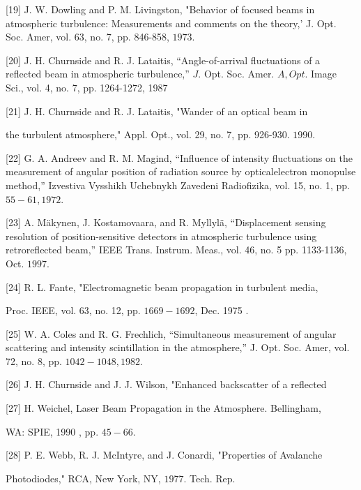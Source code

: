 \documentclass[10pt]{article}
\begin{document}
[19] J. W. Dowling and P. M. Livingston, "Behavior of focused beams in atmospheric turbulence: Measurements and comments on the theory,’ J. Opt. Soc. Amer, vol. 63, no. 7, pp. 846-858, \(1973 .\)

[20] J. H. Churnside and R. J. Lataitis, “Angle-of-arrival fluctuations of a reflected beam in atmospheric turbulence,” \(J .\) Opt. Soc. Amer. \(A, O p t .\) Image Sci., vol. 4, no. 7, pp. 1264-1272, 1987

[21] J. H. Churnside and R. J. Lataitis, "Wander of an optical beam in

the turbulent atmosphere," Appl. Opt., vol. 29, no. 7, pp. 926-930. \(1990 .\)

[22] G. A. Andreev and R. M. Magind, “Influence of intensity fluctuations on the measurement of angular position of radiation source by opticalelectron monopulse method,” Izvestiva Vysshikh Uchebnykh Zavedeni Radiofizika, vol. 15, no. 1, pp. \(55-61,1972 .\)

[23] A. Mäkynen, J. Kostamovaara, and R. Myllylä, “Displacement sensing resolution of position-sensitive detectors in atmospheric turbulence using retroreflected beam,” IEEE Trans. Instrum. Meas., vol. 46, no. 5 pp. 1133-1136, Oct. \(1997 .\)

[24] R. L. Fante, "Electromagnetic beam propagation in turbulent media,

Proc. IEEE, vol. 63, no. 12, pp. \(1669-1692\), Dec. 1975 .

[25] W. A. Coles and R. G. Frechlich, “Simultaneous measurement of angular scattering and intensity scintillation in the atmosphere,” J. Opt. Soc. Amer, vol. 72, no. 8, pp. \(1042-1048,1982\).

[26] J. H. Churnside and J. J. Wilson, "Enhanced backscatter of a reflected

[27] H. Weichel, Laser Beam Propagation in the Atmosphere. Bellingham,

WA: SPIE, 1990 , pp. \(45-66\).

[28] P. E. Webb, R. J. McIntyre, and J. Conardi, "Properties of Avalanche

Photodiodes," RCA, New York, NY, \(1977 .\) Tech. Rep.
\end{document}
